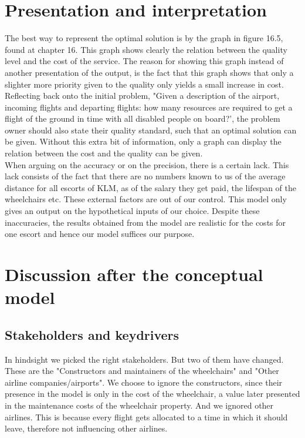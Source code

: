 \documentclass[a4paper, 11pt, notitlepage]{report}
\begin{document}
\chapter{Presentation and interpretation}
The best way to represent the optimal solution is by the graph in figure 16.5, found at chapter 16. This graph shows clearly the relation between the quality level and the cost of the service. The reason for showing this graph instead of another presentation of the output, is the fact that this graph shows that only a slighter more priority given to the quality only yields a small increase in cost.\\
Reflecting back onto the initial problem, "Given a description of the airport, incoming flights and departing flights: how many resources are required to get a flight of the ground in time with all disabled people on board?', the problem owner should also state their quality standard, such that an optimal solution can be given. Without this extra bit of information, only a graph can display the relation between the cost and the quality can be given.\\
When arguing on the accuracy or on the precision, there is a certain lack. This lack consists of the fact that there are no numbers known to us of the average distance for all escorts of KLM, as of the salary they get paid, the lifespan of the wheelchairs etc. These external factors are out of our control. This model only gives an output on the hypothetical inputs of our choice. Despite these inaccuracies, the results obtained from the model are realistic for the costs for one escort and hence our model suffices our purpose.

\chapter{Discussion after the conceptual model}
	\section{Stakeholders and keydrivers} In hindsight we picked the right stakeholders. But two of them have changed. These are the "Constructors and maintainers of the wheelchairs" and "Other airline companies/airports". We choose to ignore the constructors, since their presence in the model is only in the cost of the wheelchair, a value later presented in the maintenance costs of the wheelchair property.  And we ignored other airlines. This is because every flight gets allocated to a time in which it should leave, therefore not influencing other airlines. %
	
\end{document}

